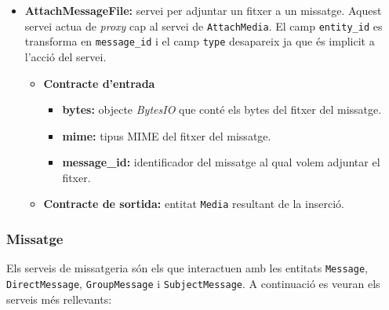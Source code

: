 \begin{itemize}
			\item \textbf{AttachMessageFile:} servei per adjuntar un fitxer a un missatge. Aquest servei actua de \emph{proxy} cap al servei de \texttt{AttachMedia}. El camp \texttt{entity\_id} es transforma en \texttt{message\_id} i el camp \texttt{type} desapareix ja que és implicit a l'acció del servei.
			
			\begin{itemize}
					\item \textbf{Contracte d'entrada}
						\begin{itemize}
							\item \textbf{bytes:} objecte \emph{BytesIO} que conté els bytes del fitxer del missatge.
							\item \textbf{mime:} tipus \ac{MIME} del fitxer del missatge.
							\item \textbf{message\_id:} identificador del missatge al qual volem adjuntar el fitxer.
						\end{itemize}
					\item \textbf{Contracte de sortida:} entitat \texttt{Media} resultant de la inserció.
				\end{itemize}
		\end{itemize}
				
		\subsubsection{Missatge}
		
		Els serveis de missatgeria són els que interactuen amb les entitats \texttt{Message}, \texttt{DirectMessage}, \texttt{GroupMessage} i \texttt{SubjectMessage}. A continuació es veuran els serveis més rellevants:
		
